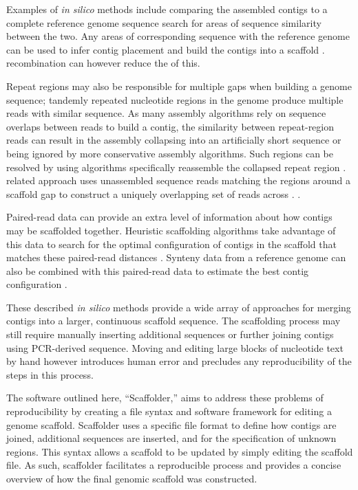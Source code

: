 \documentclass[10pt]{bmc_article}
\newenvironment{bmcformat}{\begin{raggedright}\baselineskip20pt\sloppy\setboolean{publ}{false}}{\end{raggedright}\baselineskip20pt\sloppy}
\begin{document}
\begin{bmcformat}
Examples of \emph{in silico} methods include 
comparing the assembled contigs to a complete reference genome sequence
 search for areas of sequence similarity between the
two. Any areas of corresponding sequence with the reference genome can be used
to infer contig placement and build the contigs into a scaffold
\cite{richter2007,zhao2008,assefa2009}.  recombination
 can however reduce the
 of this. \pb

Repeat regions may also be responsible for multiple gaps when building
a genome sequence; tandemly repeated nucleotide regions in the genome produce
multiple reads with similar sequence. As many assembly algorithms rely on
sequence overlaps between reads to build a contig, the similarity between
repeat-region reads can result in the assembly collapsing into an artificially
short sequence or being ignored by more conservative assembly algorithms. Such
regions can be resolved by using algorithms  specifically reassemble
the collapsed repeat region  \cite{mulyukov2002,koren2010}.
 related approach uses unassembled sequence reads matching
the regions around a scaffold gap to construct a uniquely overlapping set of
reads across . \cite{tsai2010}. \pb

Paired-read data can provide an extra level of information about how contigs
may be scaffolded together. Heuristic scaffolding algorithms take advantage of
this data to search for the optimal configuration of contigs in the scaffold
that matches these paired-read distances \cite{dayarian2010,boetzer2011}.
Synteny data from a reference genome can also be combined with this
paired-read data to estimate the best contig configuration \cite{pop2004}. \pb

These described \emph{in silico} methods provide a wide array of approaches for
merging contigs into a larger, continuous scaffold sequence.
 The scaffolding process may still require manually
inserting additional sequences or further joining contigs using PCR-derived
sequence. Moving and editing large blocks of nucleotide text by hand however
 introduces human error and precludes any reproducibility of
the steps in this process. \pb

The software outlined here, ``Scaffolder,'' aims to address these problems of
reproducibility by creating a file syntax and software framework for editing
a genome scaffold. Scaffolder uses a specific file format to define how
contigs are joined, additional sequences are inserted, and for the
specification of unknown regions. This syntax allows a scaffold to be updated
by simply editing the scaffold file. As such, scaffolder facilitates
a reproducible  process and provides a concise
overview of how the final genomic scaffold was constructed. \pb


\end{bmcformat}
\end{document}
